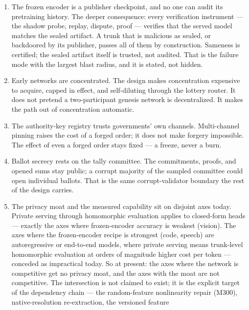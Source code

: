 \documentclass[11pt]{article}
\begin{document}
\begin{enumerate}
code vector summarizes an input, and feature-inversion attacks
against public frozen encoders reconstruct recognizable inputs
from codes. The data contract therefore covers codes with the
same no-retention, no-training rules as the inputs they
summarize. Inversion risk is a named residual: contract rules can
be broken, and cryptography does not cover codes.
\item The frozen encoder is a publisher checkpoint, and no one
can audit its pretraining history. The deeper consequence: every
verification instrument --- the shadow probe, replay, dispute,
proof --- verifies that the served model matches the sealed
artifact. A trunk that is malicious as sealed, or backdoored by
its publisher, passes all of them by construction. Sameness is
certified; the sealed artifact itself is trusted, not audited.
That is the failure mode with the largest blast radius, and it is
stated, not hidden.
\item Early networks are concentrated. The design makes
concentration expensive to acquire, capped in effect, and
self-diluting through the lottery router. It does not pretend a
two-participant genesis network is decentralized. It makes the
path out of concentration automatic.
\item The authority-key registry trusts governments' own
channels. Multi-channel pinning raises the cost of a forged
order; it does not make forgery impossible. The effect of even a
forged order stays fixed --- a freeze, never a burn.
\item Ballot secrecy rests on the tally committee. The
commitments, proofs, and opened sums stay public; a corrupt
majority of the sampled committee could open individual ballots.
That is the same corrupt-validator boundary the rest of the
design carries.
\item The privacy moat and the measured capability sit on
disjoint axes today. Private serving through homomorphic
evaluation applies to closed-form heads --- exactly the axes
where frozen-encoder accuracy is weakest (vision). The axes where
the frozen-encoder recipe is strongest (code, speech) are
autoregressive or end-to-end models, where private serving means
trunk-level homomorphic evaluation at orders of magnitude higher
cost per token --- conceded as impractical today. So at present:
the axes where the network is competitive get no privacy moat,
and the axes with the moat are not competitive. The intersection
is not claimed to exist; it is the explicit target of the
dependency chain --- the random-feature nonlinearity repair
(M300), native-resolution re-extraction, the versioned feature

\end{enumerate}
\end{document}
